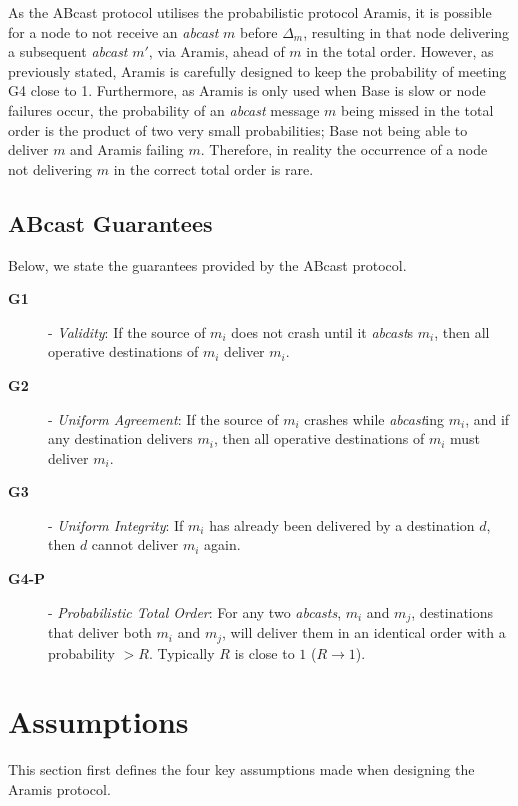 As the \textsf{ABcast} protocol utilises the probabilistic protocol \textsf{Aramis}, it is possible for a node to not receive an \emph{abcast} $m$ before $\Delta_m$, resulting in that node delivering a subsequent \emph{abcast} $m'$, via \textsf{Aramis}, ahead of $m$ in the total order.  However, as previously stated, \textsf{Aramis} is carefully designed to keep the probability of meeting G4 close to 1.  Furthermore, as \textsf{Aramis} is only used when \textsf{Base} is slow or node failures occur, the probability of an \emph{abcast} message $m$ being missed in the total order is the product of two very small probabilities; \textsf{Base} not being able to deliver $m$ and \textsf{Aramis} failing $m$.  Therefore, in reality the occurrence of a node not delivering  $m$ in the correct total order is rare.   

    \subsection{ABcast Guarantees}
    Below, we state the guarantees provided by the \textsf{ABcast} protocol.  
   
    \begin{description}
    \item [\textbf{G1}] - \emph{Validity}: If the source of $m_i$ does not crash until it \emph{abcast}s $m_i$, then all operative destinations of $m_i$ deliver $m_i$.
    
    \item [\textbf{G2}] - \emph{Uniform Agreement}: If the source of $m_i$ crashes while \emph{abcast}ing $m_i$, and if any destination delivers $m_i$, then all operative
destinations of $m_i$ must deliver $m_i$.

    \item [\textbf{G3}] - \emph{Uniform Integrity}: If $m_i$ has already been delivered by a destination $d$, then $d$ cannot deliver $m_i$ again. 
    
    \item [\textbf{G4-P}] - \emph{Probabilistic Total Order}: For any two \emph{\emph{abcast}s}, $m_i$ and $m_j$, destinations that deliver both $m_i$ and $m_j$, will deliver them in an identical order with a probability $> R$.  Typically $R$ is close to $1$ ($R \rightarrow 1$).
\end{description}

\section{Assumptions}
    This section first defines the four key assumptions made when designing the \textsf{Aramis} protocol. 

